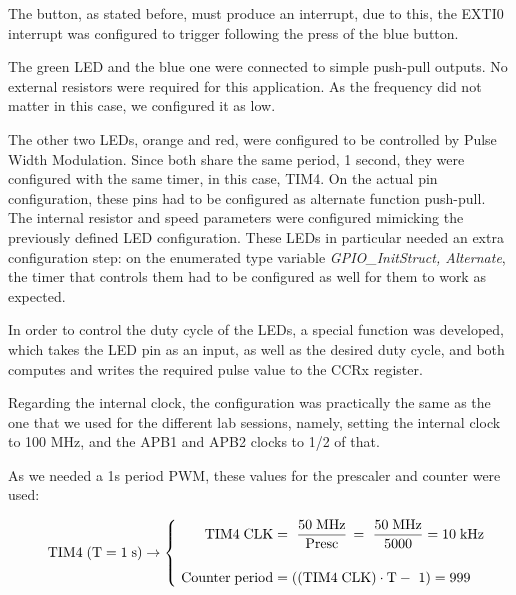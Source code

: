 The button, as stated before, must produce an interrupt, due to this, the EXTI0 interrupt was configured to trigger following the press of the blue button. \medskip

The green LED and the blue one were connected to simple push-pull outputs. No external resistors were required for this application. As the frequency did not matter in this case, we configured it as low.\medskip

The other two LEDs, orange and red, were configured to be controlled by Pulse Width Modulation. Since both share the same period, 1 second, they were configured with the same timer, in this case, TIM4. On the actual pin configuration, these pins had to be configured as alternate function push-pull. The internal resistor and speed parameters were configured mimicking the previously defined LED configuration. These LEDs in particular needed an extra configuration step: on the enumerated type variable \textit{GPIO\_InitStruct, Alternate}, the timer that controls them had to be configured as well for them to work as expected. \medskip

In order to control the duty cycle of the LEDs, a special function was developed, which takes the LED pin as an input, as well as the desired duty cycle, and both computes and writes the required pulse value to the CCRx register.


\medskip

Regarding the internal clock, the configuration was practically the same as the one that we used for the different lab sessions, namely, setting the internal clock to 100 MHz, and the APB1 and APB2 clocks to 1/2 of that.\medskip

As we needed a 1s period PWM, these values for the prescaler and counter were used:

\begin{equation*}
        \hspace{0.35cm} \mathrm{TIM4 \;} (\mathrm{T} = 1\;\mathrm{s)} \rightarrow \left\{ \begin{aligned}
	        \mathrm{TIM4 \; CLK} &= \,\, \dfrac{50\;\mathrm{MHz}}{\mathrm{Presc}} \, = \,\, \dfrac{50\;\mathrm{MHz}}{5000} = 10\;\mathrm{kHz}\\[\bigskipamount]
	        \,\, \mathrm{Counter \; period} &= \left( \left( \mathrm{TIM4 \; CLK} \right) \cdot \mathrm{T} -\,\,1 \right) = 999\\
        \end{aligned} \right. \\[\bigskipamount]
\end{equation*} 


